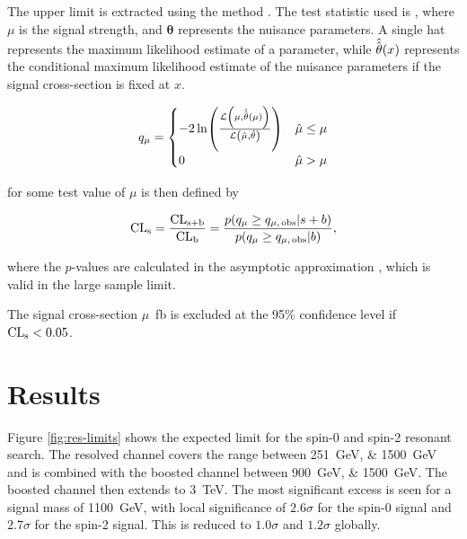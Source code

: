 The upper limit is extracted using the \CLs method \cite{Read02}. The test statistic 
used is \qmu \cite{Cowan11}, where $\mu$ is the signal strength, and $\mathbf{\theta}$ represents the nuisance
parameters. A single hat represents
the maximum likelihood estimate of a parameter, while
$\hat{\hat{\mathbf{\theta}}}\qty(x)$ represents the conditional maximum
likelihood estimate of the nuisance parameters if the signal cross-section is
fixed at $x$.


\begin{equation}
	\label{eqn:qmu-def}
	{q}_{\mu} =
	\begin{cases}
		-2\ln(\frac{\mathcal{L}\qty(\mu, \hat{\hat{\mathbf{\theta}}}\qty(\mu))}{\mathcal{L}\qty(\hat{\mu},
		\hat{\mathbf{\theta}})})              & \hat{\mu} \le \mu \\
		0                                     & \hat{\mu} > \mu
	\end{cases}
\end{equation}

\CLs for some test value of $\mu$ is then defined by

\begin{equation}
	\label{eqn:cls-def}
	\text{CL}\textsubscript{s} = \frac{\text{CL}\textsubscript{s+b}}{\text{CL}\textsubscript{b}} = \frac{p\qty({q}_{\mu} \ge {q}_{\mu,\,\text{obs}} | s + b)}{p\qty({q}_{\mu} \ge {q}_{\mu,\,\text{obs}} | b)},
\end{equation}

where the $p$-values are calculated in the asymptotic approximation
\cite{Cowan11}, which is valid in the large sample limit.

The signal cross-section {$\mu$}~\si{\femto\barn} is excluded at the 95\% confidence level if $\text{CL}\textsubscript{s} < 0.05$.

\FloatBarrier
\clearpage
\section{Results}
Figure \ref{fig:res-limits} shows the expected limit for the spin-0 and spin-2 resonant search. The 
resolved channel covers the range between \SIlist{251;1500}{\GeV} and is combined with the boosted channel between \SIlist{900;1500}{\GeV}. The boosted channel then extends to \SI{3}{\TeV}. The most significant excess is seen 
for a signal mass of \SI{1100}{\GeV}, with local significance of $2.6\sigma$ for the spin-0 signal and 
$2.7\sigma$ for the spin-2 signal. This is reduced to $1.0\sigma$ and $1.2\sigma$ globally. 

